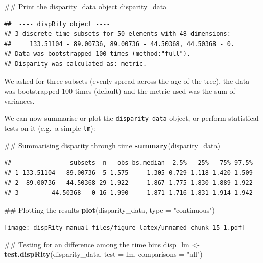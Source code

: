 \documentclass[]{book}
\newenvironment{Shaded}{\begin{snugshade}}{\end{snugshade}}
\newcommand{\KeywordTok}[1]{\textcolor[rgb]{0.13,0.29,0.53}{\textbf{#1}}}
\newcommand{\DataTypeTok}[1]{\textcolor[rgb]{0.13,0.29,0.53}{#1}}
\newcommand{\StringTok}[1]{\textcolor[rgb]{0.31,0.60,0.02}{#1}}
\newcommand{\NormalTok}[1]{#1}
\theoremstyle{definition}
\theoremstyle{definition}
\theoremstyle{remark}
\begin{document}
\begin{Shaded}
\begin{Highlighting}[]
\NormalTok{## Print the disparity_data object}
\NormalTok{disparity_data}
\end{Highlighting}
\end{Shaded}

\begin{verbatim}
##  ---- dispRity object ---- 
## 3 discrete time subsets for 50 elements with 48 dimensions:
##     133.51104 - 89.00736, 89.00736 - 44.50368, 44.50368 - 0.
## Data was bootstrapped 100 times (method:"full").
## Disparity was calculated as: metric.
\end{verbatim}

We asked for three subsets (evenly spread across the age of the tree),
the data was bootstrapped 100 times (default) and the metric used was
the sum of variances.

We can now summarise or plot the \texttt{disparity\_data} object, or
perform statistical tests on it (e.g.~a simple \texttt{lm}):

\begin{Shaded}
\begin{Highlighting}[]
\NormalTok{## Summarising disparity through time}
\KeywordTok{summary}\NormalTok{(disparity_data)}
\end{Highlighting}
\end{Shaded}

\begin{verbatim}
##                subsets  n   obs bs.median  2.5%   25%   75% 97.5%
## 1 133.51104 - 89.00736  5 1.575     1.305 0.729 1.118 1.420 1.509
## 2  89.00736 - 44.50368 29 1.922     1.867 1.775 1.830 1.889 1.922
## 3         44.50368 - 0 16 1.990     1.871 1.716 1.831 1.914 1.942
\end{verbatim}

\begin{Shaded}
\begin{Highlighting}[]
\NormalTok{## Plotting the results}
\KeywordTok{plot}\NormalTok{(disparity_data, }\DataTypeTok{type =} \StringTok{"continuous"}\NormalTok{)}
\end{Highlighting}
\end{Shaded}

\texttt{[image: dispRity\_manual\_files/figure-latex/unnamed-chunk-15-1.pdf]}

\begin{Shaded}
\begin{Highlighting}[]
\NormalTok{## Testing for an difference among the time bins}
\NormalTok{disp_lm <-}\StringTok{ }\KeywordTok{test.dispRity}\NormalTok{(disparity_data, }\DataTypeTok{test =}\NormalTok{ lm, }\DataTypeTok{comparisons =} \StringTok{"all"}\NormalTok{)}
\end{Highlighting}
\end{Shaded}
\end{document}
